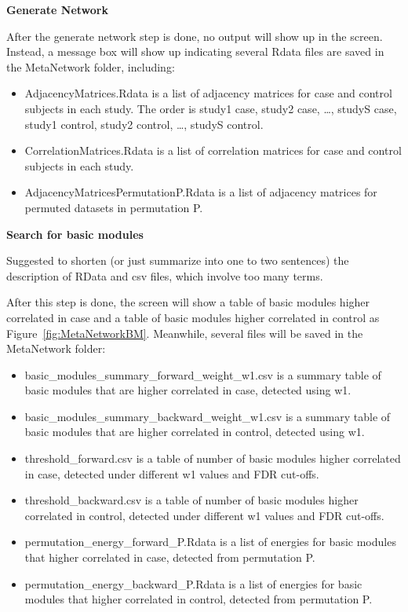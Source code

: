 \textbf{Generate Network}

After the generate network step is done, no output will show up in the screen. Instead, a message box will show up indicating several Rdata files are saved in the MetaNetwork folder, including:

\begin{itemize}
\item AdjacencyMatrices.Rdata is a list of adjacency matrices for case and control subjects in each study. The order is study1 case, study2 case, \dots, studyS case, study1 control, study2 control, \dots, studyS control.
\item CorrelationMatrices.Rdata is a list of correlation matrices for case and control subjects in each study.
\item AdjacencyMatricesPermutationP.Rdata is a list of adjacency matrices for permuted datasets in permutation P.
\end{itemize}

\textbf{Search for basic modules}

{\color{red}
Suggested to shorten (or just summarize into one to two sentences) the description of RData and csv files, which involve too many terms. 
}

After this step is done, the screen will show a table of basic modules higher correlated in case and a table of basic modules higher correlated in control as Figure~\ref{fig:MetaNetworkBM}. Meanwhile, several files will be saved in the MetaNetwork folder:

\begin{itemize}
 \item basic\_modules\_summary\_forward\_weight\_w1.csv is a summary table of basic modules that are higher correlated in case, detected using w1.
 \item basic\_modules\_summary\_backward\_weight\_w1.csv is a summary table of basic modules that are higher correlated in control, detected using w1.
\item threshold\_forward.csv is a table of number of basic modules higher correlated in case, detected under different w1 values and FDR cut-offs.
\item threshold\_backward.csv is a table of number of basic modules higher correlated in control, detected under different w1 values and FDR cut-offs.
 \item permutation\_energy\_forward\_P.Rdata is a list of energies for basic modules that higher correlated in case, detected from permutation P.
  \item permutation\_energy\_backward\_P.Rdata is a list of energies for basic modules that higher correlated in control, detected from permutation P.
\end{itemize}


